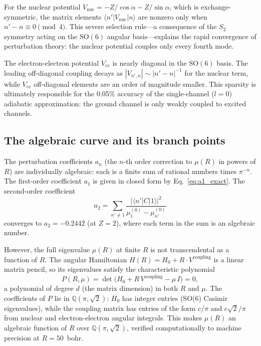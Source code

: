 \documentclass[aps,pra,twocolumn,superscriptaddress,longbibliography]{revtex4-2}
\begin{document}
For the nuclear potential $V_{\mathrm{nuc}} = -Z/\cos\alpha -
Z/\sin\alpha$, which is exchange-symmetric, the matrix elements
$\langle n' | V_{\mathrm{nuc}} | n \rangle$ are nonzero only when
$n' - n \equiv 0 \pmod{4}$.  This severe selection rule---a
consequence of the $S_2$ symmetry acting on the $\mathrm{SO}(6)$
angular basis---explains the rapid convergence of perturbation
theory: the nuclear potential couples only every fourth mode.

The electron-electron potential $V_{ee}$ is nearly diagonal in the
$\mathrm{SO}(6)$ basis.  The leading off-diagonal coupling decays
as $|V_{n',n}| \sim |n' - n|^{-1}$ for the nuclear term, while
$V_{ee}$ off-diagonal elements are an order of magnitude smaller.
This sparsity is ultimately responsible for the 0.05\% accuracy
of the single-channel ($l = 0$) adiabatic approximation: the
ground channel is only weakly coupled to excited channels.

\subsection{The algebraic curve and its branch points}
\label{sec:algebraic_boundary}

The perturbation coefficients $a_n$ (the $n$-th order correction
to $\mu(R)$ in powers of $R$) are individually algebraic: each
is a finite sum of rational numbers times $\pi^{-n}$.  The
first-order coefficient $a_1$ is given in closed form by
Eq.~\eqref{eq:a1_exact}.  The second-order coefficient
\begin{equation}
  a_2 = \sum_{n' \neq 1}
  \frac{|\langle n' | C | 1 \rangle|^2}
  {\mu_1^{(0)} - \mu_{n'}^{(0)}}
  \label{eq:a2_sum}
\end{equation}
converges to $a_2 = -0.2442$ (at $Z = 2$), where each term in the
sum is an algebraic number.

However, the full eigenvalue $\mu(R)$ at finite $R$ is not
transcendental as a function of $R$.  The angular Hamiltonian
$H(R) = H_0 + R \cdot V^{\mathrm{coupling}}$ is a linear matrix
pencil, so its eigenvalues satisfy the characteristic polynomial
\begin{equation}
  P(R, \mu) = \det\!\bigl(H_0 + R\,V^{\mathrm{coupling}} - \mu\,I\bigr)
  = 0,
  \label{eq:char_poly}
\end{equation}
a polynomial of degree $d$ (the matrix dimension) in both $R$ and $\mu$.
The coefficients of $P$ lie in $\mathbb{Q}(\pi, \sqrt{2})$: $H_0$ has
integer entries (SO(6) Casimir eigenvalues), while the coupling matrix
has entries of the form $c/\pi$ and $c\sqrt{2}/\pi$ from nuclear and
electron-electron angular integrals.  This makes $\mu(R)$ an algebraic
function of $R$ over $\mathbb{Q}(\pi, \sqrt{2})$, verified computationally
to machine precision at $R = 50$~bohr.
\end{document}
